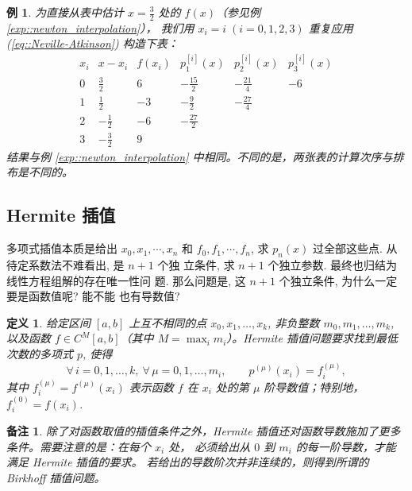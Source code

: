 \documentclass[a4paper]{ctexart}
\newtheorem{remark}{备注}
\newtheorem{definition}[theorem]{定义} %
\newtheorem{example}[theorem]{例}
\numberwithin{theorem}{section}
\numberwithin{equation}{section}
\numberwithin{figure}{section}
\numberwithin{remark}{section}
\begin{document}
\begin{example}
    \label{exp::Neville-Atkinson}
为直接从表中估计 $x=\tfrac{3}{2}$ 处的 $f(x)$（参见例 \ref{exp::newton_interpolation}），
我们用 $x_i=i\;(i=0,1,2,3)$ 重复应用 (\ref{eq::Neville-Atkinson}) 构造下表：
\begin{equation}
    \label{eq::Neville-Atkinson-table}
\begin{array}{cccccc}
x_i & x-x_i & f(x_i) & p^{[i]}_1(x) & p^{[i]}_2(x) & p^{[i]}_3(x)\\
0 & \tfrac{3}{2} & 6 & -\tfrac{15}{2} & -\tfrac{21}{4} & -6\\
1 & \tfrac{1}{2} & -3 & -\tfrac{9}{2} & -\tfrac{27}{4} & \\
2 & -\tfrac{1}{2} & -6 & -\tfrac{27}{2} & & \\
3 & -\tfrac{3}{2} & 9 & & &
\end{array}
\end{equation}
结果与例 \ref{exp::newton_interpolation} 中相同。不同的是，两张表的计算次序与排布是不同的。
\end{example}


\subsection{Hermite 插值}

多项式插值本质是给出 $x_0, x_1, \cdots, x_n$ 和 $f_0, f_1, \cdots,
f_n$, 求 $p_n(x)$ 过全部这些点. 从待定系数法不难看出, 是 $n + 1$ 个独
立条件, 求 $n + 1$ 个独立参数. 最终也归结为线性方程组解的存在唯一性问
题. 那么问题是, 这 $n + 1$ 个独立条件, 为什么一定要是函数值呢? 能不能
也有导数值?

\begin{definition}
    \label{def::hermite_interpolation}
给定区间 $[a,b]$ 上互不相同的点 $x_0,x_1,\ldots,x_k$, 非负整数 $m_0,m_1,\ldots,m_k$, 
以及函数 $f\in C^{M}[a,b]$（其中 $M=\max_i m_i$）。Hermite 插值问题要求找到最低次数的多项式 $p$, 使得
\begin{equation}
    \label{eq::hermite_interpolation}
\forall\, i=0,1,\ldots,k,\ \forall\, \mu=0,1,\ldots,m_i,\qquad
p^{(\mu)}(x_i)=f^{(\mu)}_i,
\end{equation}
其中 $f^{(\mu)}_i=f^{(\mu)}(x_i)$ 表示函数 $f$ 在 $x_i$ 处的第 $\mu$ 阶导数值；特别地，$f^{(0)}_i=f(x_i)$.
\end{definition}

\begin{remark}
除了对函数取值的插值条件之外，Hermite 插值还对函数导数施加了更多条件。需要注意的是：在每个 $x_i$ 处，
必须给出从 $0$ 到 $m_i$ 的每一阶导数，才能满足 Hermite 插值的要求。
若给出的导数阶次并非连续的，则得到所谓的 Birkhoff 插值问题。
\end{remark}
\end{document}
